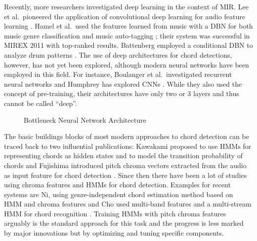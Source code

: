 \documentclass{article}
\begin{document}
Recently, more researchers investigated deep learning in the context of MIR. Lee et al.\ pioneered the application of convolutional deep learning for audio feature learning \cite{lee2009unsupervised}. Hamel et al.\ used the features learned from music with a DBN for both music genre classification and music auto-tagging \cite{hamel2010learning}; their system was successful in MIREX 2011 with top-ranked results. Battenberg employed a conditional DBN to analyze drum patterns \cite{battenberg2012analyzing}. The use of deep architectures for chord detections, however, has not yet been explored, although modern neural networks have been employed in this field. For instance, Boulanger et al.\ investigated recurrent neural networks \cite{boulanger2013audio} and Humphrey has explored CNNs \cite{humphrey2012rethinking,humphrey2012learning}. While they also used the concept of pre-training, their architectures have only two or 3 layers and thus cannot be called ``deep''.
\begin{figure}
 \centerline{}
 \caption{Bottleneck Neural Network Architecture}
 \label{fig:bottleneck}
\end{figure}

The basic buildings blocks of most modern approaches to chord detection can be traced back to two influential publications: Kawakami proposed to use HMMs for representing chords as hidden states and to model the transition probability of chords \cite{kawakami2000hidden} and Fujishima introduced pitch chroma vectors extracted from the audio as input feature for chord detection \cite{fujishima1999realtime}. Since then there have been a lot of studies using chroma features and HMMs for chord detection\cite{papadopoulos2007large,cho2010exploring}. Examples for recent systems are  Ni, using genre-independent chord estimation method based on HMM and chroma features \cite{ni2012using} and Cho used multi-band features and a multi-stream HMM for chord recognition \cite{cho2013mirex}. Training HMMs with pitch chroma features arguably is the standard approach for this task and the progress is less marked by major innovations but by optimizing and tuning specific components. 
\end{document}
